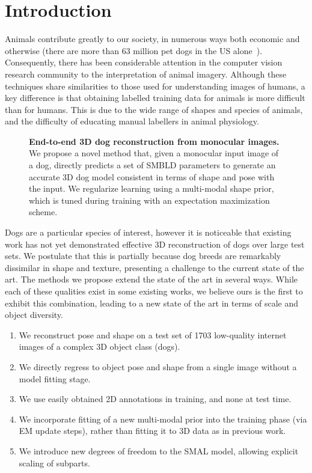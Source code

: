 \section{Introduction}
  Animals contribute greatly to our society, in numerous ways both economic and otherwise (there are more than 63 million pet dogs in the US alone~\cite{appa20}).
  Consequently, there has been considerable attention in the computer vision research community to the interpretation of animal imagery.
  Although these techniques share similarities to those used for understanding images of humans, a key difference is that obtaining labelled training data for animals is more difficult than for humans. This is due to the wide range of shapes and species of animals, and the difficulty of educating manual labellers in animal physiology.
  \begin{figure}[t]
  \medbreak
  \caption{
  \textbf{End-to-end 3D dog reconstruction from monocular images.}
  We propose a novel method that, given a monocular input image of a dog, directly predicts a set of SMBLD parameters to generate an accurate 3D dog model consistent in terms of shape and pose with the input. 
  We regularize learning using a multi-modal shape prior, which is tuned during training with an expectation maximization scheme.\label{fig:splash}}
  \end{figure}
  
  Dogs are a particular species of interest, however it is noticeable that existing work has not yet demonstrated effective 3D reconstruction of dogs over large test sets.
  We postulate that this is partially because dog breeds are remarkably dissimilar in shape and texture, presenting a challenge to the current state of the art.
  The methods we propose extend the state of the art in several ways.
  While each of these qualities exist in some existing works, we believe ours is the first to exhibit this combination, leading to a new state of the art in terms of scale and object diversity.
  \begin{enumerate}
      \item We reconstruct pose and shape on a test set of 1703 low-quality internet images of a complex 3D object class (dogs).
      \item We directly regress to object pose and shape from a single image without a model fitting stage.
      \item We use easily obtained 2D annotations in training, and none at test time.
      \item We incorporate fitting of a new multi-modal prior into the training phase (via EM update steps), rather than fitting it to 3D data as in previous work.
      \item We introduce new degrees of freedom to the SMAL model, 
      allowing explicit scaling of subparts.
  \end{enumerate}
  
